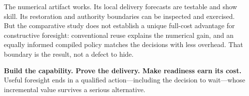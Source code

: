 The numerical artifact works. Its local delivery forecasts are testable and show skill. Its restoration and authority boundaries can be inspected and exercised. But the comparative study does not establish a unique full-cost advantage for constructive foresight: conventional reuse explains the numerical gain, and an equally informed compiled policy matches the decisions with less overhead. That boundary is the result, not a defect to hide.

\begin{claimbox}
\textbf{Build the capability. Prove the delivery. Make readiness earn its cost.}\\[3pt]
Useful foresight ends in a qualified action---including the decision to wait---whose incremental value survives a serious alternative.
\end{claimbox}
